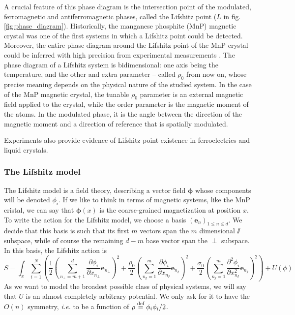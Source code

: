 A crucial feature of this phase diagram is the intersection point of the modulated, ferromagnetic and antiferromagnetic phases, called the Lifshitz point ($L$ in fig. \eqref{fig:phase_diagram}). 
Historically, the manganese phosphite (MnP) magnetic crystal was one of the first systems in which a Lifshitz point could be detected. Moreover, the entire phase diagram around the Lifshitz point of the MnP crystal could be inferred with high precision from experimental measurements \cite{MnP}.
The phase diagram of a Lifshitz system is bidimensional: one axis being the temperature, and the other and extra parameter -- called $\rho_0$ from now on, whose precise meaning depends on the physical nature of the studied system.
In the case of the MnP magnetic crystal, the tunable $\rho_0$ parameter is an external magnetic field applied to the crystal, while the order parameter  is the magnetic moment of the atoms. In the modulated phase, it is the angle between the direction of the magnetic moment and a direction of reference that is spatially modulated.

Experiments also provide evidence of Lifshitz point existence in ferroelectrics and liquid crystals.

\subsubsection{The Lifshitz model}

The Lifshitz model is a field theory, describing a vector field $\boldsymbol{\phi}$ whose components will be denoted $\phi_i$.
If we like to think in terms of magnetic systems, like the MnP cristal, we can say that $\boldsymbol{\phi}(x)$ is the coarse-grained magnetization at position $x$.
 To write the action for the Lifshitz model, we choose a basis $(\mathbf{e}_n)_{1 \leq n \leq d}$. We decide that this basis is such that its first $m$ vectors span the $m$ dimensional $\sslash$ subspace, while of course the remaining $d-m$ base vector span the $\perp$ subspace. In this basis, the Lifshitz action is
\begin{equation}
S = \int_x \sum_{i=1}^N \left( \frac{1}{2} \left(\sum_{n_\perp=m+1}^{d}\frac{\partial \phi_i}{\partial x_{n_\perp}} \mathbf{e}_{n_\perp}\right)^2 + \frac{\rho_0}{2} \left(\sum_{n_\sslash=1}^{m}\frac{\partial \phi_i}{\partial x_{n_\sslash}} \mathbf{e}_{n_\sslash}\right)^2 + \frac{\sigma_0}{2} \left(\sum_{n_\sslash=1}^{m} \frac{\partial^2 \phi_i}{\partial x_{n_\sslash}^2} \mathbf{e}_{n_\sslash}\right)^2 \right) + U(\phi)
\end{equation}
As we want to model the broadest possible class of physical systems, we will say that $U$ is an almost completely arbitrary potential. We only ask for it to have the $O(n)$ symmetry, \textit{i.e.} to be a function of $\rho  \overset{\text{def}}{=}  \phi_i \phi_i/2$.

